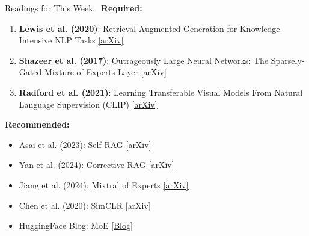 \documentclass[aspectratio=169]{beamer}
\begin{document}
\begin{frame}[shrink=10]{Readings for This Week 📖}
\textbf{Required:}
\begin{enumerate}\setlength{\itemsep}{0pt}
    \item \textbf{Lewis et al. (2020)}: Retrieval-Augmented Generation for Knowledge-Intensive NLP Tasks
    \href{https://arxiv.org/abs/2005.11401}{[arXiv]}

    \item \textbf{Shazeer et al. (2017)}: Outrageously Large Neural Networks: The Sparsely-Gated Mixture-of-Experts Layer
    \href{https://arxiv.org/abs/1701.06538}{[arXiv]}

    \item \textbf{Radford et al. (2021)}: Learning Transferable Visual Models From Natural Language Supervision (CLIP)
    \href{https://arxiv.org/abs/2103.00020}{[arXiv]}
\end{enumerate}

\vspace{0.5em}

\textbf{Recommended:}
\begin{itemize}\setlength{\itemsep}{0pt}
    \item Asai et al. (2023): Self-RAG \href{https://arxiv.org/abs/2310.11511}{[arXiv]}
    \item Yan et al. (2024): Corrective RAG \href{https://arxiv.org/abs/2401.15884}{[arXiv]}
    \item Jiang et al. (2024): Mixtral of Experts \href{https://arxiv.org/abs/2401.04088}{[arXiv]}
    \item Chen et al. (2020): SimCLR \href{https://arxiv.org/abs/2002.05709}{[arXiv]}
    \item HuggingFace Blog: MoE \href{https://huggingface.co/blog/moe}{[Blog]}
\end{itemize}
\end{frame}
\end{document}
